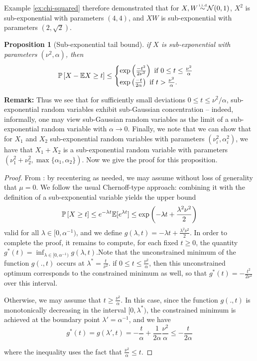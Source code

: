 \documentclass{article}[12pt]
\newtheorem{prop}{Proposition}
\def\E{\mathbb{E}}
\def \E{\mathbb E}
\begin{document}
 
 Example \ref{ex:chi-squared} therefore demonstrated that for $X,W \iid \Normal(0,1)$, $X^2$ is sub-exponential with parameters $(4,4)$, and $XW$ is sub-exponential with parameters $(2,\sqrt{2})$. 

\begin{prop}[Sub-exponential tail bound]
if $X$ is sub-exponential with parameters $(\nu^2,\alpha)$, then
\begin{equation}
\Prob{X - \E X \geq t} \leq \begin{cases} \exp{\frac{-t^2}{2\nu^2}}\text{ if $0\leq t \leq \frac{\nu^2}{\alpha}$} \\
\exp{\frac{-t}{2\alpha}}\text{ if $t > \frac{\nu^2}{\alpha}.$}\end{cases}
\label{eq:sub-exp-bound}
\end{equation}

\end{prop}


\textbf{Remark:} Thus we see that for sufficiently small deviations $0\leq t \leq \nu^2/\alpha$, sub-exponential random variables exhibit sub-Gaussian concentration -- indeed, informally, one may view sub-Gaussian random variables as the limit of a sub-exponential random variable with $\alpha \to 0$.  Finally, we note that we can show that for $X_1$ and $X_2$ sub-exponential random variables with parameters $(\nu_i^2,\alpha_i^2)$, we have that $X_1 + X_2$ is a sub-exponential random variable with parameters $(\nu_1^2 + \nu_2^2, \max\{\alpha_1, \alpha_2\})$.  Now we give the proof for this proposition.

\begin{proof} From \cite{wainwright2019high}: by recentering as needed, we may assume without loss of generality that $\mu=0$. We follow the usual Chernoff-type approach: combining it with the definition of a sub-exponential variable yields the upper bound
\[\Prob{X\geq t}\leq e^{-\lambda t}\E[e^{\lambda t}]\leq \exp{-\lambda t+ \frac{\lambda^2\nu^2}{2}} \]
valid for all $\lambda \in [0,\alpha^{-1})$, and we define $g(\lambda, t)=-\lambda t+ \frac{\lambda^2\nu^2}{2}$. In order to complete the proof, it remains to compute, for each fixed $t\geq 0$, the quantity $g^*(t)=\inf_{\lambda \in [0,\alpha^{-1})} g(\lambda, t)$.Note that the unconstrained minimum of the function $g(.,t)$ occurs at $\lambda^* = \frac{t}{\nu^2}$. if $0\leq t\leq \frac{\nu^2}{\alpha}$, then this unconstrained optimum corresponds to the constrained minimum as well, so that $g^*(t)=-\frac{t^2}{2\nu^2}$ over this interval. 

Otherwise, we may assume that $t\geq \frac{\nu^2}{\alpha}$. In this case, since the function $g(.,t)$ is monotonically decreasing in the interval $[0,\lambda^*)$, the constrained minimum is achieved at the boundary point $\lambda'=\alpha^{-1}$, and we have 
\[g^*(t)=g(\lambda',t)=-\frac{t}{\alpha}+ \frac{1}{2\alpha}\frac{\nu^2}{\alpha}\leq -\frac{t}{2\alpha}\]

where the inequality uses the fact that $\frac{\nu^2}{\alpha}\leq t$.
\end{proof}
\end{document}
